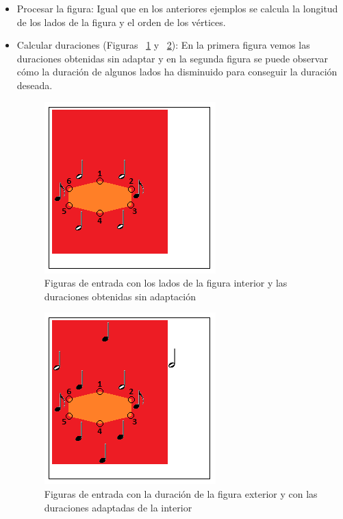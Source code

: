 \begin{itemize}

	\item Procesar la figura: Igual que en los anteriores ejemplos se calcula la longitud de los lados de la figura y el orden de los vértices.

	\item Calcular duraciones (Figuras ~\ref{fig:Figura1Voz2} y ~\ref{fig:Figura2Voz2}): En la primera figura vemos las duraciones obtenidas sin adaptar y en la segunda figura se puede observar cómo la duración de algunos lados ha disminuido para conseguir la duración deseada.

 		\begin{figure}[htbp]
		\centering
		\hspace*{0.0in}
		\includegraphics[scale=1]{graphics/simpletest4-F2.png}
		\caption{Figuras de entrada con los lados de la figura interior y las duraciones obtenidas sin adaptación}
		\label{fig:Figura1Voz2}
		\end{figure}

		\begin{figure}[htbp]
		\centering
		\hspace*{0.0in}
		\includegraphics[scale=1]{graphics/simpletest4-F2_2.png}
		\caption{Figuras de entrada con la duración de la figura exterior y con las duraciones adaptadas de la interior}
		\label{fig:Figura2Voz2}
		\end{figure}


\end{itemize}
